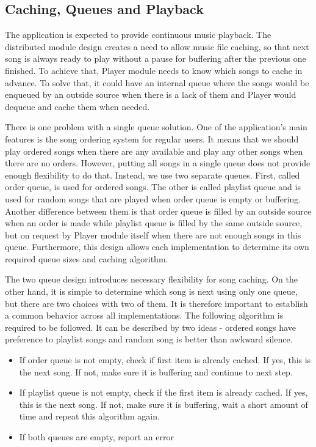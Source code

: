 \subsection{Caching, Queues and Playback}

The application is expected to provide continuous music playback. The distributed module design creates a need to allow music file caching, so that next song is always ready to play without a pause for buffering after the previous one finished. To achieve that, Player module needs to know which songs to cache in advance. To solve that, it could have an internal queue where the songs would be enqueued by an outside source when there is a lack of them and Player would dequeue and cache them when needed.
\par
There is one problem with a single queue solution. One of the application's main features is the song ordering system for regular users. It means that we should play ordered songs when there are any available and play any other songs when there are no orders. However, putting all songs in a single queue does not provide enough flexibility to do that. Instead, we use two separate queues. First, called order queue, is used for ordered songs. The other is called playlist queue and is used for random songs that are played when order queue is empty or buffering. Another difference between them is that order queue is filled by an outside source when an order is made while playlist queue is filled by the same outside source, but on request by Player module itself when there are not enough songs in this queue. Furthermore, this design allows each implementation to determine its own required queue sizes and caching algorithm.
\par
The two queue design introduces necessary flexibility for song caching. On the other hand, it is simple to determine which song is next using only one queue, but there are two choices with two of them. It is therefore important to establish a common behavior across all implementations. The following algorithm is required to be followed. It can be described by two ideas - ordered songs have preference to playlist songs and random song is better than awkward silence.

\begin{itemize}
    \item If order queue is not empty, check if first item is already cached. If yes, this is the next song. If not, make sure it is buffering and continue to next step.
    \item If playlist queue is not empty, check if the first item is already cached. If yes, this is the next song. If not, make sure it is buffering, wait a short amount of time and repeat this algorithm again.
    \item If both queues are empty, report an error
\end{itemize}

